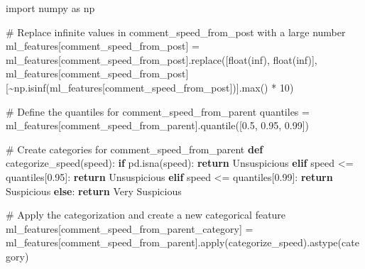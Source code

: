 \documentclass[
  12pt,
  letterpaper,
  DIV=11,
  numbers=noendperiod]{scrartcl}
\newenvironment{Shaded}{\begin{snugshade}}{\end{snugshade}}
\newcommand{\BuiltInTok}[1]{\textcolor[rgb]{0.00,0.23,0.31}{#1}}
\newcommand{\CommentTok}[1]{\textcolor[rgb]{0.37,0.37,0.37}{#1}}
\newcommand{\ControlFlowTok}[1]{\textcolor[rgb]{0.00,0.23,0.31}{\textbf{#1}}}
\newcommand{\DecValTok}[1]{\textcolor[rgb]{0.68,0.00,0.00}{#1}}
\newcommand{\FloatTok}[1]{\textcolor[rgb]{0.68,0.00,0.00}{#1}}
\newcommand{\ImportTok}[1]{\textcolor[rgb]{0.00,0.46,0.62}{#1}}
\newcommand{\KeywordTok}[1]{\textcolor[rgb]{0.00,0.23,0.31}{\textbf{#1}}}
\newcommand{\NormalTok}[1]{\textcolor[rgb]{0.00,0.23,0.31}{#1}}
\newcommand{\OperatorTok}[1]{\textcolor[rgb]{0.37,0.37,0.37}{#1}}
\newcommand{\StringTok}[1]{\textcolor[rgb]{0.13,0.47,0.30}{#1}}
\begin{document}
\begin{Shaded}
\begin{Highlighting}[]
\ImportTok{import}\NormalTok{ numpy }\ImportTok{as}\NormalTok{ np}

\CommentTok{\# Replace infinite values in \textquotesingle{}comment\_speed\_from\_post\textquotesingle{} with a large number}
\NormalTok{ml\_features[}\StringTok{\textquotesingle{}comment\_speed\_from\_post\textquotesingle{}}\NormalTok{] }\OperatorTok{=}\NormalTok{ ml\_features[}\StringTok{\textquotesingle{}comment\_speed\_from\_post\textquotesingle{}}\NormalTok{].replace([}\BuiltInTok{float}\NormalTok{(}\StringTok{\textquotesingle{}inf\textquotesingle{}}\NormalTok{), }\BuiltInTok{float}\NormalTok{(}\StringTok{\textquotesingle{}{-}inf\textquotesingle{}}\NormalTok{)], ml\_features[}\StringTok{\textquotesingle{}comment\_speed\_from\_post\textquotesingle{}}\NormalTok{][}\OperatorTok{\textasciitilde{}}\NormalTok{np.isinf(ml\_features[}\StringTok{\textquotesingle{}comment\_speed\_from\_post\textquotesingle{}}\NormalTok{])].}\BuiltInTok{max}\NormalTok{() }\OperatorTok{*} \DecValTok{10}\NormalTok{)}

\CommentTok{\# Define the quantiles for comment\_speed\_from\_parent}
\NormalTok{quantiles }\OperatorTok{=}\NormalTok{ ml\_features[}\StringTok{\textquotesingle{}comment\_speed\_from\_parent\textquotesingle{}}\NormalTok{].quantile([}\FloatTok{0.5}\NormalTok{, }\FloatTok{0.95}\NormalTok{, }\FloatTok{0.99}\NormalTok{])}

\CommentTok{\# Create categories for comment\_speed\_from\_parent}
\KeywordTok{def}\NormalTok{ categorize\_speed(speed):}
    \ControlFlowTok{if}\NormalTok{ pd.isna(speed):}
        \ControlFlowTok{return} \StringTok{\textquotesingle{}Unsuspicious\textquotesingle{}}
    \ControlFlowTok{elif}\NormalTok{ speed }\OperatorTok{\textless{}=}\NormalTok{ quantiles[}\FloatTok{0.95}\NormalTok{]:}
        \ControlFlowTok{return} \StringTok{\textquotesingle{}Unsuspicious\textquotesingle{}}
    \ControlFlowTok{elif}\NormalTok{ speed }\OperatorTok{\textless{}=}\NormalTok{ quantiles[}\FloatTok{0.99}\NormalTok{]:}
        \ControlFlowTok{return} \StringTok{\textquotesingle{}Suspicious\textquotesingle{}}
    \ControlFlowTok{else}\NormalTok{:}
        \ControlFlowTok{return} \StringTok{\textquotesingle{}Very Suspicious\textquotesingle{}}

\CommentTok{\# Apply the categorization and create a new categorical feature}
\NormalTok{ml\_features[}\StringTok{\textquotesingle{}comment\_speed\_from\_parent\_category\textquotesingle{}}\NormalTok{] }\OperatorTok{=}\NormalTok{ ml\_features[}\StringTok{\textquotesingle{}comment\_speed\_from\_parent\textquotesingle{}}\NormalTok{].}\BuiltInTok{apply}\NormalTok{(categorize\_speed).astype(}\StringTok{\textquotesingle{}category\textquotesingle{}}\NormalTok{)}


\end{Highlighting}
\end{Shaded}
\end{document}
